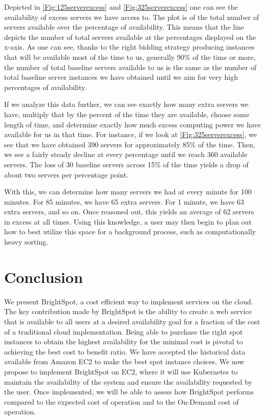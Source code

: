 \documentclass[thesis,proposal]{umassthesis}  %
\begin{document}
Depicted in \ref{Fig:125serverexcess} and \ref{Fig:325serverexcess} one can see the availability of excess servers we have access to. The plot is of the total number of servers available over the percentage of availability. This means that the line depicts the number of total servers available at the percentages displayed on the x-axis. As one can see, thanks to the right bidding strategy producing instances that will be available most of the time to us, generally 90\% of the time or more, the number of total baseline servers available to us is the same as the number of total baseline server instances we have obtained until we aim for very high percentages of availability.\par

If we analyze this data further, we can see exactly how many extra servers we have, multiply that by the percent of the time they are available, choose some length of time, and determine exactly how much excess computing power we have available for us in that time. For instance, if we look at \ref{Fig:325serverexcess}, we see that we have obtained 390 servers for approximately 85\% of the time. Then, we see a fairly steady decline at every percentage until we reach 360 available servers. The loss of 30 baseline servers across 15\% of the time yields a drop of about two servers per percentage point.\par

With this, we can determine how many servers we had at every minute for 100 minutes. For 85 minutes, we have 65 extra servers. For 1 minute, we have 63 extra servers, and so on. Once reasoned out, this yields an average of 62 servers in excess at all times. Using this knowledge, a user may then begin to plan out how to best utilize this space for a background process, such as computationally heavy sorting.




\chapter{Conclusion}

We present BrightSpot, a cost efficient way to implement services on the cloud. The key contribution made by BrightSpot is the ability to create a web service that is available to all users at a desired availability goal for a fraction of the cost of a traditional cloud implementation. Being able to purchase the right spot instances to obtain the highest availability for the minimal cost is pivotal to achieving the best cost to benefit ratio. We have accepted the historical data available from Amazon EC2 to make the best spot instance choices. We now propose to implement BrightSpot on EC2, where it will use Kubernetes to maintain the availability of the system and ensure the availability requested by the user. Once implemented, we will be able to assess how BrightSpot performs compared to the expected cost of operation and to the On-Demand cost of operation. 
\end{document}
